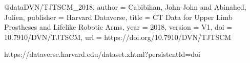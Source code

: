 @data{DVN/TJTSCM_2018,
author = {Cabibihan, John-John and Abinahed, Julien},
publisher = {Harvard Dataverse},
title = {{CT Data for Upper Limb Prostheses and Lifelike Robotic Arms}},
year = {2018},
version = {V1},
doi = {10.7910/DVN/TJTSCM},
url = {https://doi.org/10.7910/DVN/TJTSCM}
}


https://dataverse.harvard.edu/dataset.xhtml?persistentId=doi%